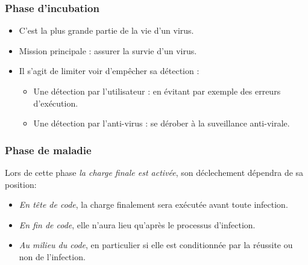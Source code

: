 \documentclass{beamer}
\newcommand{\enlight}[1]{\textit{\color{blue}#1}}
\begin{document}
\begin{frame}
\frametitle{Phase d'incubation}
\begin{itemize}
\item C'est la plus grande partie de la vie d'un virus. 
\item Mission principale : assurer la survie d'un virus. 
\item Il s'agit de limiter voir d'empêcher sa détection :
\begin{itemize}
\item Une détection par l'utilisateur : en évitant par exemple des erreurs d'exécution.%
  \bigskip 
\item Une détection par l'anti-virus : se dérober à la suveillance anti-virale. 

\end{itemize}
\end{itemize}
\end{frame}



\begin{frame}
\frametitle{Phase de maladie}
Lors de cette phase \enlight{la charge finale est activée}, son déclechement dépendra de sa position: %
\begin{itemize}
\item \enlight{En tête de code},  la charge finalement sera exécutée avant toute infection. %
\item \enlight{En fin de code}, elle n'aura lieu qu'après le processus d'infection.
\item \enlight{Au milieu du code}, en particulier si elle est conditionnée par la réussite ou non de l'infection. 
\end{itemize}
\end{frame}
\end{document}
